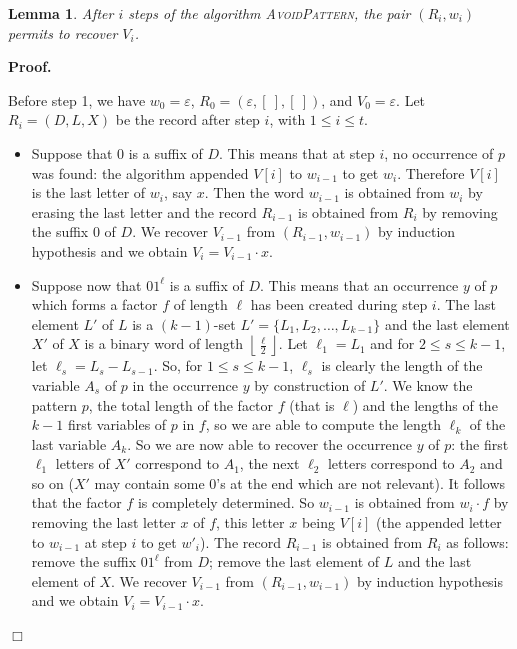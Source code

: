 \documentclass[]{elsart}
\def\floor#1{\left\lfloor #1 \right\rfloor}
\newcommand{\set}[1]{\{#1\}}
\newcommand{\ap}{\textsc{AvoidPattern}\xspace}
\newenvironment{proof}{\par \noindent \textbf{Proof.}
}{\hfill$\Box$\medskip}
\newtheorem{lemma}[theorem]{Lemma}
\begin{document}
\begin{lemma}\label{lem:inj}
  After $i$ steps of the algorithm \ap, the pair $(R_i,w_i)$ permits to recover $V_i$.
\end{lemma}

\begin{proof}
  Before step 1, we have $w_0=\varepsilon$, $R_0=(\varepsilon,[\ ],[\ 
  ])$, and $V_0=\varepsilon$.
  Let $R_i=(D,L,X)$ be the record after step $i$, with $1\le i\le t$. 
  \begin{itemize}
  \item Suppose that $0$ is a suffix of $D$. This means that at step
    $i$, no occurrence of $p$ was found: the algorithm appended $V[i]$
    to $w_{i-1}$ to get $w_i$. Therefore $V[i]$ is the last letter of
    $w_i$, say $x$.  Then the word $w_{i-1}$ is obtained from $w_i$ by
    erasing the last letter and the record $R_{i-1}$ is obtained from
    $R_i$ by removing the suffix $0$ of $D$. We recover $V_{i-1}$ from
    $(R_{i-1},w_{i-1})$ by induction hypothesis and we obtain
    $V_i=V_{i-1}\cdot x$.
  
  \item Suppose now that $01^\ell$ is a suffix of $D$. This means that
    an occurrence $y$ of $p$ which forms a factor $f$ of length $\ell$
    has been created during step $i$. The last element $L'$ of $L$ is
    a $(k-1)$-set $L'=\set{L_1,L_2,\ldots,L_{k-1}}$ and the last
    element $X'$ of $X$ is a binary word of length
    $\floor{\frac{\ell}{2}}$. Let $\ell_1=L_1$ and for $2\le s\le
    k-1$, let $\ell_s=L_{s}-L_{s-1}$. So, for $1\le s\le k-1$,
    $\ell_s$ is clearly the length of the variable $A_s$ of $p$ in the
    occurrence $y$ by construction of $L'$. We know the pattern $p$,
    the total length of the factor $f$ (that is $\ell$) and the
    lengths of the $k-1$ first variables of $p$ in $f$, so we are able
    to compute the length $\ell_k$ of the last variable $A_k$.  So we
    are now able to recover the occurrence $y$ of $p$: the first
    $\ell_1$ letters of $X'$ correspond to $A_1$, the next $\ell_2$
    letters correspond to $A_2$ and so on ($X'$ may contain some $0$'s
    at the end which are not relevant). It follows that the factor $f$
    is completely determined. So $w_{i-1}$ is obtained from $w_i\cdot
    f$ by removing the last letter $x$ of $f$, this letter $x$ being
    $V[i]$ (the appended letter to $w_{i-1}$ at step $i$ to get
    $w'_i$). The record $R_{i-1}$ is obtained from $R_i$ as follows:
    remove the suffix $01^\ell$ from $D$; remove the last element of
    $L$ and the last element of $X$.  We recover $V_{i-1}$ from
    $(R_{i-1},w_{i-1})$ by induction hypothesis and we obtain
    $V_i=V_{i-1}\cdot x$.
  \end{itemize}
\end{proof}
\end{document}
